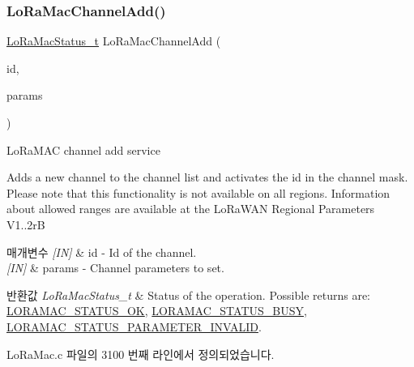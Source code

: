 \subsubsection{\texorpdfstring{Lo\+Ra\+Mac\+Channel\+Add()}{LoRaMacChannelAdd()}}
{\footnotesize\ttfamily \mbox{\hyperlink{group___l_o_r_a_m_a_c_ga30bd25657e10480f8605ee951b0ecfbd}{Lo\+Ra\+Mac\+Status\+\_\+t}} Lo\+Ra\+Mac\+Channel\+Add (\begin{DoxyParamCaption}\item[{uint8\+\_\+t}]{id,  }\item[{\mbox{\hyperlink{group___l_o_r_a_m_a_c_ga1360ca6f82c6d125ea43a9dad9b56184}{Channel\+Params\+\_\+t}}}]{params }\end{DoxyParamCaption})}



Lo\+Ra\+M\+AC channel add service 

Adds a new channel to the channel list and activates the id in the channel mask. Please note that this functionality is not available on all regions. Information about allowed ranges are available at the Lo\+Ra\+W\+AN Regional Parameters V1..\+2rB


\begin{DoxyParams}{매개변수}
{\em \mbox{[}\+I\+N\mbox{]}} & id -\/ Id of the channel.\\
\hline
{\em \mbox{[}\+I\+N\mbox{]}} & params -\/ Channel parameters to set.\\
\hline
\end{DoxyParams}

\begin{DoxyRetVals}{반환값}
{\em Lo\+Ra\+Mac\+Status\+\_\+t} & Status of the operation. Possible returns are\+: \mbox{\hyperlink{group___l_o_r_a_m_a_c_gga1d18f26b344040b3ec5c3db662919661a03db5fca052313edb3823c014b653a74}{L\+O\+R\+A\+M\+A\+C\+\_\+\+S\+T\+A\+T\+U\+S\+\_\+\+OK}}, \mbox{\hyperlink{group___l_o_r_a_m_a_c_gga1d18f26b344040b3ec5c3db662919661a66b12f569207eacd97ee1c1d6c4cee6d}{L\+O\+R\+A\+M\+A\+C\+\_\+\+S\+T\+A\+T\+U\+S\+\_\+\+B\+U\+SY}}, \mbox{\hyperlink{group___l_o_r_a_m_a_c_gga1d18f26b344040b3ec5c3db662919661ad0d3119f247d00e1787dda106fcb3017}{L\+O\+R\+A\+M\+A\+C\+\_\+\+S\+T\+A\+T\+U\+S\+\_\+\+P\+A\+R\+A\+M\+E\+T\+E\+R\+\_\+\+I\+N\+V\+A\+L\+ID}}. \\
\hline
\end{DoxyRetVals}


Lo\+Ra\+Mac.\+c 파일의 3100 번째 라인에서 정의되었습니다.


